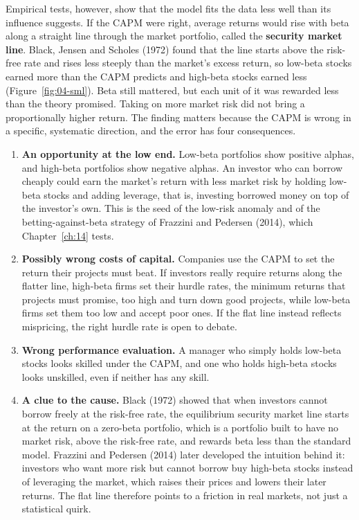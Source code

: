 Empirical tests, however, show that the model fits the data less well than its influence suggests. If the CAPM were right, average returns would rise with beta along a straight line through the market portfolio, called the \textbf{security market line}. Black, Jensen and Scholes (1972) found that the line starts above the risk-free rate and rises less steeply than the market's excess return, so low-beta stocks earned more than the CAPM predicts and high-beta stocks earned less (Figure~\ref{fig:04-sml}). Beta still mattered, but each unit of it was rewarded less than the theory promised. Taking on more market risk did not bring a proportionally higher return. The finding matters because the CAPM is wrong in a specific, systematic direction, and the error has four consequences.

\begin{enumerate}
  \item \textbf{An opportunity at the low end.} Low-beta portfolios show positive alphas, and high-beta portfolios show negative alphas. An investor who can borrow cheaply could earn the market's return with less market risk by holding low-beta stocks and adding leverage, that is, investing borrowed money on top of the investor's own. This is the seed of the low-risk anomaly and of the betting-against-beta strategy of Frazzini and Pedersen (2014), which Chapter~\ref{ch:14} tests.
  \item \textbf{Possibly wrong costs of capital.} Companies use the CAPM to set the return their projects must beat. If investors really require returns along the flatter line, high-beta firms set their hurdle rates, the minimum returns that projects must promise, too high and turn down good projects, while low-beta firms set them too low and accept poor ones. If the flat line instead reflects mispricing, the right hurdle rate is open to debate.
  \item \textbf{Wrong performance evaluation.} A manager who simply holds low-beta stocks looks skilled under the CAPM, and one who holds high-beta stocks looks unskilled, even if neither has any skill.
  \item \textbf{A clue to the cause.} Black (1972) showed that when investors cannot borrow freely at the risk-free rate, the equilibrium security market line starts at the return on a zero-beta portfolio, which is a portfolio built to have no market risk, above the risk-free rate, and rewards beta less than the standard model. Frazzini and Pedersen (2014) later developed the intuition behind it: investors who want more risk but cannot borrow buy high-beta stocks instead of leveraging the market, which raises their prices and lowers their later returns. The flat line therefore points to a friction in real markets, not just a statistical quirk.
\end{enumerate}

